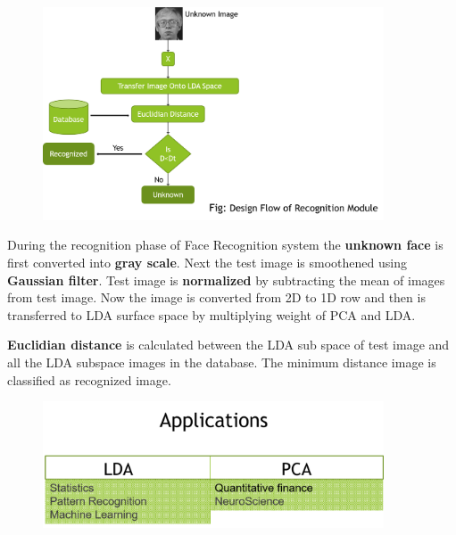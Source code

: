 \documentclass[xcolor=dvipsnames]{beamer}
\begin{document}
    
    \begin{frame}
    \begin{figure}[H]
        \graphicspath{{figs/}}
        \includegraphics[width=0.9\textwidth]{img5.png}
    \end{figure}
    \end{frame}
    
     \begin{frame}
    During the recognition phase of Face Recognition system the \textbf{unknown face} is first converted into \textbf{gray scale}. Next the test image is smoothened using \textbf{Gaussian filter}. Test image is \textbf{normalized} by subtracting the mean of images from test image. Now the image is converted from 2D to 1D row and then is transferred to LDA surface space by multiplying weight of PCA and LDA. \newline

\textbf{Euclidian distance} is calculated between the LDA sub space of test image and all the LDA subspace images in the database. The minimum distance image is classified as recognized image.
       \end{frame}
       
    \begin{frame}
    \begin{figure}[H]
        \graphicspath{{figs/}}
        \includegraphics[width=0.9\textwidth]{img6.png}
    \end{figure}
    \end{frame}
    
\end{document}
